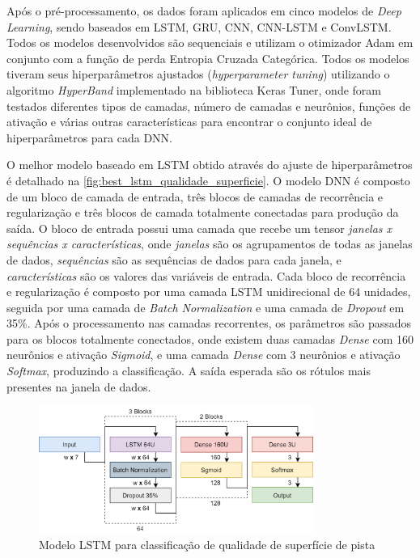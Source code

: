 Após o pré-processamento, os dados foram aplicados em cinco modelos de \textit{Deep Learning}, sendo baseados em LSTM, GRU, CNN, CNN-LSTM e ConvLSTM. Todos os modelos desenvolvidos são sequenciais e utilizam o otimizador Adam em conjunto com a função de perda Entropia Cruzada Categórica. Todos os modelos tiveram seus hiperparâmetros ajustados (\textit{hyperparameter tuning}) utilizando o algoritmo \textit{HyperBand} implementado na biblioteca Keras Tuner, onde foram testados diferentes tipos de camadas, número de camadas e neurônios, funções de ativação e várias outras características para encontrar o conjunto ideal de hiperparâmetros para cada DNN. 

O melhor modelo baseado em LSTM obtido através do ajuste de hiperparâmetros é detalhado na \autoref{fig:best_lstm_qualidade_superficie}. O modelo DNN é composto de um bloco de camada de entrada, três blocos de camadas de recorrência e regularização e três blocos de camada totalmente conectadas para produção da saída. O bloco de entrada possui uma camada que recebe um tensor \emph{janelas x sequências x características}, onde \emph{janelas} são os agrupamentos de todas as janelas de dados, \emph{sequências} são as sequências de dados para cada janela, e \emph{características} são os valores das variáveis de entrada. Cada bloco de recorrência e regularização é composto por uma camada LSTM unidirecional de 64 unidades, seguida por uma camada de \textit{Batch Normalization} e uma camada de \textit{Dropout} em 35\%. Após o processamento nas camadas recorrentes, os parâmetros são passados para os blocos totalmente conectados, onde existem duas camadas \textit{Dense} com 160 neurônios e ativação \textit{Sigmoid}, e uma camada \textit{Dense} com 3 neurônios e ativação \textit{Softmax}, produzindo a classificação. A saída esperada são os rótulos mais presentes na janela de dados.

\begin{figure}[h!]
  \centering
  \caption{Modelo LSTM para classificação de qualidade de superfície de pista}
  \label{fig:best_lstm_qualidade_superficie}
  \includegraphics[width=0.8\textwidth]{figuras/fig_46.png}
\end{figure}

